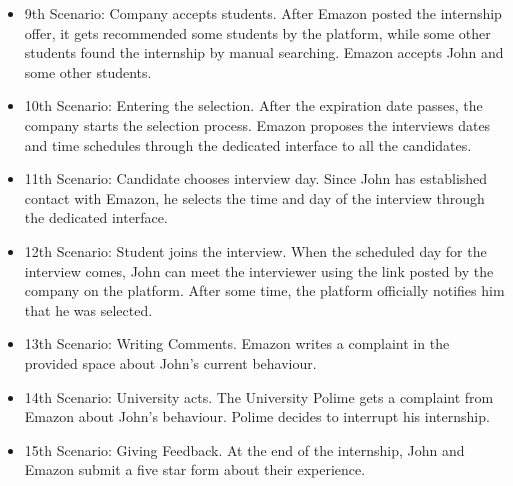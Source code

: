 \documentclass{article}
\begin{document}
\begin{itemize}
        \item 9th Scenario: Company accepts students. After Emazon posted the internship offer, it gets recommended some students by the platform, while some other students found the internship by manual searching. Emazon accepts John and some other students.
        \item 10th Scenario: Entering the selection. After the expiration date passes, the company starts the selection process. Emazon proposes the interviews dates and time schedules through the dedicated interface to all the candidates.
        \item 11th Scenario: Candidate chooses interview day. Since John has established contact with Emazon, he selects the time and day of the interview through the dedicated interface.
        \item 12th Scenario: Student joins the interview. When the scheduled day for the interview comes, John can meet the interviewer using the link posted by the company on the platform. After some time, the platform officially notifies him that he was selected.
        \item 13th Scenario: Writing Comments. Emazon writes a complaint in the provided space about John's current behaviour.
        \item 14th Scenario: University acts. The University Polime gets a complaint from Emazon about John's behaviour. Polime decides to interrupt his internship.
        \item 15th Scenario: Giving Feedback. At the end of the internship, John and Emazon submit a five star form about their experience.
    \end{itemize}
\end{document}
